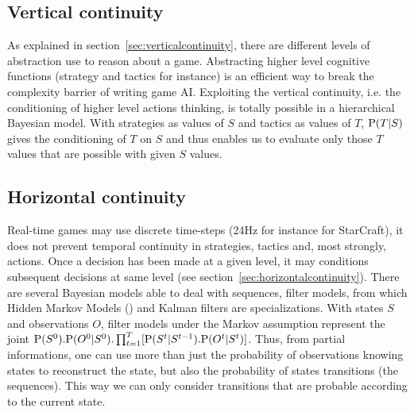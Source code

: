 \subsection{Vertical continuity}
As explained in section~\ref{sec:verticalcontinuity}, there are different levels of abstraction use to reason about a game. Abstracting higher level cognitive functions (strategy and tactics for instance) is an efficient way to break the complexity barrier of writing game AI. Exploiting the vertical continuity, i.e. the conditioning of higher level actions thinking, is totally possible in a hierarchical Bayesian model. With strategies as values of $S$ and tactics as values of $T$, $\mathrm{P}(T|S)$ gives the conditioning of $T$ on $S$ and thus enables us to evaluate only those $T$ values that are possible with given $S$ values.

\subsection{Horizontal continuity}
Real-time games may use discrete time-steps (24Hz for instance for StarCraft), it does not prevent temporal continuity in strategies, tactics and, most strongly, actions. Once a decision has been made at a given level, it may conditions subsequent decisions at same level (see section~\ref{sec:horizontalcontinuity}). There are several Bayesian models able to deal with sequences, filter models, from which Hidden Markov Models () \citep{Rabiner} and Kalman filters \citep{Kalman1960} are specializations. With states $S$ and observations $O$, filter models under the Markov assumption represent the joint $\mathrm{P}(S^0).\mathrm{P}(O^0|S^0).\prod_{t=1}^T[\mathrm{P}(S^t | S^{t-1}).\mathrm{P}(O^t|S^t)]$. Thus, from partial informations, one can use more than just the probability of observations knowing states to reconstruct the state, but also the probability of states transitions (the sequences). This way we can only consider transitions that are probable according to the current state.

